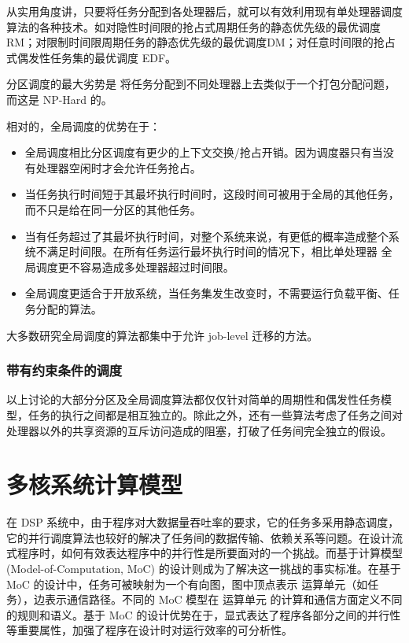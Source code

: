 从实用角度讲，只要将任务分配到各处理器后，就可以有效利用现有单处理器调度算法的各种技术。如对隐性时间限的抢占式周期任务的静态优先级的最优调度RM；对限制时间限周期任务的静态优先级的最优调度DM；对任意时间限的抢占式偶发性任务集的最优调度 EDF。

分区调度的最大劣势是 将任务分配到不同处理器上去类似于一个打包分配问题，而这是 NP-Hard 的。

相对的，全局调度的优势在于：
\begin{itemize}
  \item 全局调度相比分区调度有更少的上下文交换/抢占开销。因为调度器只有当没有处理器空闲时才会允许任务抢占。
  \item 当任务执行时间短于其最坏执行时间时，这段时间可被用于全局的其他任务，而不只是给在同一分区的其他任务。
  \item 当有任务超过了其最坏执行时间，对整个系统来说，有更低的概率造成整个系统不满足时间限。在所有任务运行最坏执行时间的情况下，相比单处理器 全局调度更不容易造成多处理器超过时间限。
  \item 全局调度更适合于开放系统，当任务集发生改变时，不需要运行负载平衡、任务分配的算法。
\end{itemize}

大多数研究全局调度的算法都集中于允许 job-level 迁移的方法。

\subsubsection{带有约束条件的调度}

以上讨论的大部分分区及全局调度算法都仅仅针对简单的周期性和偶发性任务模型，任务的执行之间都是相互独立的。除此之外，还有一些算法考虑了任务之间对处理器以外的共享资源的互斥访问造成的阻塞，打破了任务间完全独立的假设。


\section{多核系统计算模型}
\label{basic-MoC}

在 DSP 系统中，由于程序对大数据量吞吐率的要求，它的任务多采用静态调度，它的并行调度算法也较好的解决了任务间的数据传输、依赖关系等问题。在设计流式程序时，如何有效表达程序中的并行性是所要面对的一个挑战。而基于计算模型 (Model-of-Computation, MoC) 的设计则成为了解决这一挑战的事实标准。在基于 MoC 的设计中，任务可被映射为一个有向图，图中顶点表示 运算单元（如任务），边表示通信路径。不同的 MoC 模型在 运算单元 的计算和通信方面定义不同的规则和语义。基于 MoC 的设计优势在于，显式表达了程序各部分之间的并行性等重要属性，加强了程序在设计时对运行效率的可分析性。

